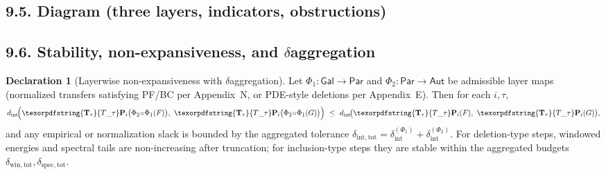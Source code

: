 \documentclass[11pt]{article}
\DeclareMathOperator{\Ext}{Ext}
\DeclareRobustCommand{\hyp}{\nobreakdash-}
\newcommand{\Pers}{\mathsf{Pers}}
\newcommand{\Rfun}{\mathcal{R}}
\numberwithin{equation}{section}
\theoremstyle{definition}
\newtheorem{declaration}[theorem]{Declaration}
\DeclareRobustCommand{\Perskft}{\Pers^{\mathrm{cons}}_{k}}
\DeclareRobustCommand{\Ttau}{\texorpdfstring{\ensuremath{\mathbf{T}_{\tau}}}{T\_\tau}}
\DeclareRobustCommand{\Ctau}{\texorpdfstring{\ensuremath{C_{\tau}}}{C\_\tau}}
\DeclareRobustCommand{\muc}{\mu_{\mathrm{Collapse}}}
\DeclareRobustCommand{\nuc}{\nu_{\mathrm{Collapse}}}
\providecommand{\n}{\unskip\space}
\begin{document}
\subsection*{9.5. Diagram (three layers, indicators, obstructions)}\label{sec:9.5}
\begin{center}
\end{center}

\subsection*{9.6. Stability, non\hyp expansiveness, and \(\delta\)\nobreakdash aggregation}
\begin{declaration}[Layerwise non\hyp expansiveness with \(\delta\)\nobreakdash aggregation]\label{spec:9-delta-agg}
Let \(\Phi_1:\mathsf{Gal}\!\to\!\mathsf{Par}\) and \(\Phi_2:\mathsf{Par}\!\to\!\mathsf{Aut}\) be admissible layer maps (normalized transfers satisfying PF/BC per Appendix~N, or PDE\hyp style deletions per Appendix~E).
Then for each \(i,\tau\),
\[
d_{\mathrm{int}}\!\Big(\Ttau\mathbf{P}_i\big(\Phi_2\!\circ\!\Phi_1(F)\big),\ \Ttau\mathbf{P}_i\big(\Phi_2\!\circ\!\Phi_1(G)\big)\Big)\n\ \le\ d_{\mathrm{int}}\!\big(\Ttau\mathbf{P}_i(F),\ \Ttau\mathbf{P}_i(G)\big),
\]
and any empirical or normalization slack is bounded by the aggregated tolerance
\(\delta_{\mathrm{int,tot}}=\delta_{\mathrm{int}}^{(\Phi_1)}+\delta_{\mathrm{int}}^{(\Phi_2)}\).
For deletion\hyp type steps, windowed energies and spectral tails are non\hyp increasing after truncation; for inclusion\hyp type steps they are stable within the aggregated budgets
\(\delta_{\mathrm{win,tot}},\delta_{\mathrm{spec,tot}}\).
\end{declaration}
\end{document}
